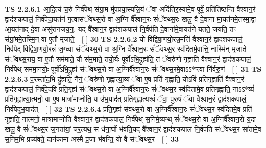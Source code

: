 \documentclass[17pt]{extarticle}
\begin{document}
                                        \textbf{ TS 2.2.6.1} \newline
                  आ॒दि॒त्यं च॒रुं निर्व॑पेथ् संग्रा॒म-मु॑पप्रया॒स्यन्नि॒यं ॅवा अदि॑तिर॒स्यामे॒व पूर्वे॒ प्रति॑तिष्ठन्ति वैश्वान॒रं द्वाद॑शकपालं॒ निर्व॑पेदा॒यत॑नं ग॒त्वासं॑ॅवथ्स॒रो वा अ॒ग्नि र्वै᳚श्वान॒रः सं॑ॅवथ्स॒रः खलु॒ वै दे॒वाना॑-मा॒यत॑नमे॒तस्मा॒द्वा आ॒यत॑नाद्-दे॒वा असु॑रानजय॒न॒. यद्-वै᳚श्वान॒रं द्वाद॑शकपालं नि॒र्वप॑ति दे॒वाना॑मे॒वायत॑ने यतते॒ जय॑ति॒ तꣳ स॑ग्रां॒ममे॒तस्मि॒न् वा ए॒तौ मृ॑जाते॒ - [  ] \textbf{  30} \newline
                  \newline
                                \textbf{ TS 2.2.6.2} \newline
                  यो वि॑द्विषा॒णयो॒रन्न॒मत्ति॑ वैश्वान॒रं द्वाद॑शकपालं॒ निर्व॑पेद्-विद्विषा॒णयो॒रन्नं॑ ज॒ग्ध्वा सं॑ॅवथ्स॒रो वा अ॒ग्नि-र्वै᳚श्वान॒रः सं॑ॅवथ्स॒र स्व॑दितमे॒वात्ति॒ नास्मि॑न् मृजाते संॅवथ्स॒राय॒ वा ए॒तौ सम॑माते॒ यौ स॑म॒माते॒ तयो॒र्यः पूर्वो॑ऽभि॒द्रुह्य॑ति॒ तं ॅवरु॑णो गृह्णाति वैश्वान॒रं द्वाद॑शकपालं॒ निर्व॑पेथ् सममा॒नयोः॒ पूर्वो॑ऽभि॒द्रुह्य॑ संॅवथ्स॒रो वा अ॒ग्निर्वै᳚श्वान॒रः सं॑ॅवथ्स॒रमे॒वाऽऽ*प्त्वा नि॑र्वरु॒णं - [  ] \textbf{  31} \newline
                  \newline
                                \textbf{ TS 2.2.6.3} \newline
                  प॒रस्ता॑द॒भि द्रु॑ह्यति॒ नैनं॒ ॅवरु॑णो गृह्णात्या॒व्यं॑ ॅवा ए॒ष प्रति॑ गृह्णाति॒ योऽविं॑ प्रतिगृ॒ह्णाति॑ वैश्वान॒रं द्वाद॑शकपालं॒ निर्व॑पे॒दविं॑ प्रति॒गृह्य॑ संॅवथ्स॒रो वा अ॒ग्निर्वै᳚श्वान॒रः सं॑ॅवथ्स॒र-स्व॑दितामे॒व प्रति॑गृह्णाति॒ नाऽऽ*व्यं॑ प्रति॑गृह्णात्या॒त्मनो॒ वा ए॒ष मात्रा॑माप्नोति॒ य उ॑भ॒याद॑त् प्रतिगृ॒ह्णात्यश्वं॑ ॅवा॒ पुरु॑षं ॅवा वैश्वान॒रं द्वाद॑शकपालं॒ निर्व॑पेदुभ॒याद॑त् - [  ] \textbf{  32} \newline
                  \newline
                                \textbf{ TS 2.2.6.4} \newline
                  प्रति॒गृह्य॑ संवथ्स॒रो वा अ॒ग्निर्वै᳚श्वान॒रः सं॑ॅवथ्स॒र-स्व॑दितमे॒व प्रति॑ गृह्णाति॒ नात्मनो॒ मात्रा॑माप्नोति वैश्वान॒रं द्वाद॑शकपालं॒ निर्व॑पेथ्-स॒निमे॒ष्यन्थ्-सं॑ॅवथ्स॒रो वा अ॒ग्निर्वै᳚श्वान॒रो य॒दा खलु॒ वै सं॑ॅवथ्स॒रं ज॒नता॑यां॒ चर॒त्यथ॒ स ध॑ना॒र्घो भ॑वति॒यद्-वै᳚श्वान॒रं द्वाद॑शकपालं नि॒र्वप॑ति संॅवथ्स॒र-सा॑तामे॒व स॒निम॒भि प्रच्य॑वते॒ दान॑कामा अस्मै प्र॒जा भ॑वन्ति॒ यो वै सं॑ॅवथ्स॒रं - [  ] \textbf{  33} \newline
                  \newline
\end{document}
